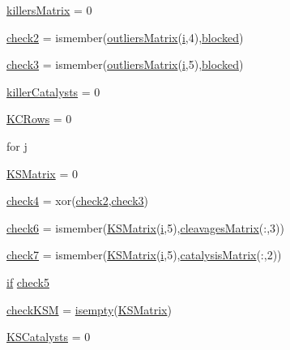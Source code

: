 \begin{DoxyCompactItemize}
\item 
\hyperlink{a00023_a929016802e1ede2217a41240a6974fa6}{killers\-Matrix} = 0
\item 
\hyperlink{a00023_a98a8838a85ed24032563a44271b1525a}{check2} = ismember(\hyperlink{a00024_a9733b61dd859b1133aa3aa849cf70cbc}{outliers\-Matrix}(\hyperlink{a00065_ad3efca1ea6e3333daf30719ee0501862}{i},4),\hyperlink{a00024_a1faaaae288fc8ca4ed1751049aa2f84f}{blocked})
\item 
\hyperlink{a00023_adfd17509248a56986475a25ee50fe488}{check3} = ismember(\hyperlink{a00024_a9733b61dd859b1133aa3aa849cf70cbc}{outliers\-Matrix}(\hyperlink{a00065_ad3efca1ea6e3333daf30719ee0501862}{i},5),\hyperlink{a00024_a1faaaae288fc8ca4ed1751049aa2f84f}{blocked})
\item 
\hyperlink{a00023_a1a42aaee01b2cc37a3835e0fe30cf9d3}{killer\-Catalysts} = 0
\item 
\hyperlink{a00023_a62227634d3ceda9bf932c630583da2b9}{K\-C\-Rows} = 0
\item 
for \hyperlink{a00023_ad34e9c7e9ae69ae0b9f1866faed5e4ad}{j}
\item 
\hyperlink{a00023_aea43faf8d3d68de03c645edc96b0c1c0}{K\-S\-Matrix} = 0
\item 
\hyperlink{a00023_ab21c5bac10f7ac73374c002e908df5ac}{check4} = xor(\hyperlink{a00024_a98a8838a85ed24032563a44271b1525a}{check2},\hyperlink{a00024_adfd17509248a56986475a25ee50fe488}{check3})
\item 
\hyperlink{a00023_a0c9b097ea561ab0f23a69197786a243a}{check6} = ismember(\hyperlink{a00024_ab18f9eabd5f873bd17d226d786bc22df}{K\-S\-Matrix}(\hyperlink{a00065_ad3efca1ea6e3333daf30719ee0501862}{i},5),\hyperlink{a00024_a90d1d83fdcae4fb1cba5129d5820d33c}{cleavages\-Matrix}(\-:,3))
\item 
\hyperlink{a00023_a0bbe7d2ceb7b248f0826d069d5a1b735}{check7} = ismember(\hyperlink{a00024_ab18f9eabd5f873bd17d226d786bc22df}{K\-S\-Matrix}(\hyperlink{a00065_ad3efca1ea6e3333daf30719ee0501862}{i},5),\hyperlink{a00024_a244eec8903103b5bbddef461276286ce}{catalysis\-Matrix}(\-:,2))
\item 
\hyperlink{a00024_a01d55766b8058903dd360b4bda71f9f5}{if} \hyperlink{a00023_abee07c73829351d18ba356c86e3e096d}{check5}
\item 
\hyperlink{a00023_a67eb148eecfd241148ce3711f058ac2b}{check\-K\-S\-M} = \hyperlink{a00019_ac10445404f4b83302522defb59e25ef7}{isempty}(\hyperlink{a00024_ab18f9eabd5f873bd17d226d786bc22df}{K\-S\-Matrix})
\item 
\hyperlink{a00023_a25c085d4378366ed81f0f97547802c8f}{K\-S\-Catalysts} = 0

\end{DoxyCompactItemize}
